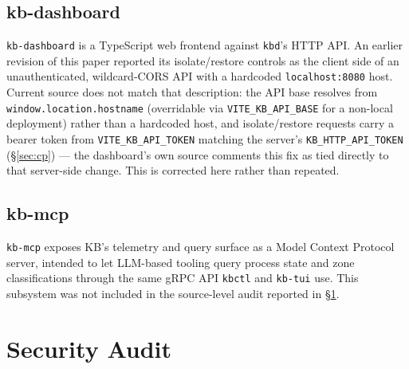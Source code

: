 \documentclass{article}
\begin{document}
\subsection{kb-dashboard}

\texttt{kb-dashboard} is a TypeScript web frontend against \texttt{kbd}'s
HTTP API. An earlier revision of this paper reported its isolate/restore
controls as the client side of an unauthenticated, wildcard-CORS API
with a hardcoded \texttt{localhost:8080} host. Current source does not
match that description: the API base resolves from
\texttt{window.location.hostname} (overridable via
\texttt{VITE\_KB\_API\_BASE} for a non-local deployment) rather than a
hardcoded host, and isolate/restore requests carry a bearer token from
\texttt{VITE\_KB\_API\_TOKEN} matching the server's
\texttt{KB\_HTTP\_API\_TOKEN} (\S\ref{sec:cp}) --- the dashboard's own
source comments this fix as tied directly to that server-side change.
This is corrected here rather than repeated.

\subsection{kb-mcp}

\texttt{kb-mcp} exposes KB's telemetry and query surface as a Model
Context Protocol server, intended to let LLM-based tooling query
process state and zone classifications through the same gRPC API
\texttt{kbctl} and \texttt{kb-tui} use. This subsystem was not included
in the source-level audit reported in \S\ref{sec:audit}.

\section{Security Audit}
\label{sec:audit}
\end{document}
